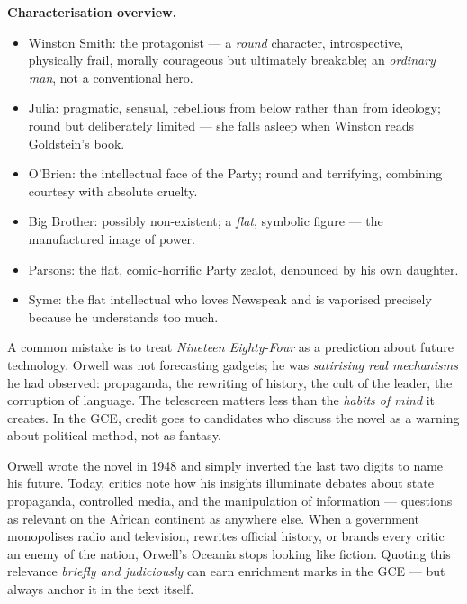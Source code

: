 \documentclass[11pt]{article}
\newcommand{\cle}[1]{{\popxbold\color{popdark}#1}}
\begin{document}
\textbf{Characterisation overview.}\par
\begin{itemize}
\item \cle{Winston Smith}: the protagonist — a \emph{round} character, introspective, physically frail, morally courageous but ultimately breakable; an \emph{ordinary man}, not a conventional hero.
\item \cle{Julia}: pragmatic, sensual, rebellious from below rather than from ideology; round but deliberately limited — she falls asleep when Winston reads Goldstein's book.
\item \cle{O'Brien}: the intellectual face of the Party; round and terrifying, combining courtesy with absolute cruelty.
\item \cle{Big Brother}: possibly non-existent; a \emph{flat}, symbolic figure — the manufactured image of power.
\item \cle{Parsons}: the flat, comic-horrific Party zealot, denounced by his own daughter.
\item \cle{Syme}: the flat intellectual who loves Newspeak and is vaporised precisely because he understands too much.
\end{itemize}

\begin{attention}
A common mistake is to treat \emph{Nineteen Eighty-Four} as a prediction about future technology. Orwell was not forecasting gadgets; he was \emph{satirising real mechanisms} he had observed: propaganda, the rewriting of history, the cult of the leader, the corruption of language. The telescreen matters less than the \emph{habits of mind} it creates. In the GCE, credit goes to candidates who discuss the novel as a warning about political method, not as fantasy.
\end{attention}

\begin{savaistu}
Orwell wrote the novel in 1948 and simply inverted the last two digits to name his future. Today, critics note how his insights illuminate debates about state propaganda, controlled media, and the manipulation of information — questions as relevant on the African continent as anywhere else. When a government monopolises radio and television, rewrites official history, or brands every critic an enemy of the nation, Orwell's Oceania stops looking like fiction. Quoting this relevance \emph{briefly and judiciously} can earn enrichment marks in the GCE — but always anchor it in the text itself.
\end{savaistu}
\end{document}
